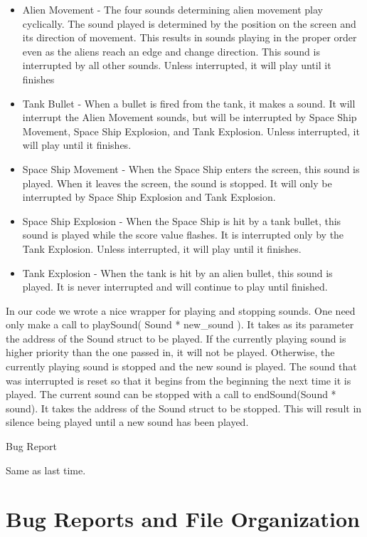 \documentclass[11pt,letter,oneside]{report}
\begin{document}
\begin{itemize}
\item Alien Movement - The four sounds determining alien movement play cyclically.  The sound played is determined by the position on the screen and its direction of movement.  This results in sounds playing in the proper order even as the aliens reach an edge and change direction.  This sound is interrupted by all other sounds.  Unless interrupted, it will play until it finishes
\item Tank Bullet - When a bullet is fired from the tank, it makes a sound.  It will interrupt the Alien Movement sounds, but will be interrupted by Space Ship Movement, Space Ship Explosion, and Tank Explosion.  Unless interrupted, it will play until it finishes.
\item Space Ship Movement - When the Space Ship enters the screen, this sound is played.  When it leaves the screen, the sound is stopped.  It will only be interrupted by Space Ship Explosion and Tank Explosion.
\item Space Ship Explosion - When the Space Ship is hit by a tank bullet, this sound is played while the score value flashes.  It is interrupted only by the Tank Explosion.  Unless interrupted, it will play until it finishes.
\item Tank Explosion - When the tank is hit by an alien bullet, this sound is played.  It is never interrupted and will continue to play until finished.
\end{itemize}

In our code we wrote a nice wrapper for playing and stopping sounds.  One need only make a call to playSound( Sound * new\_sound ).  It takes as its parameter the address of the Sound struct to be played.  If the currently playing sound is higher priority than the one passed in, it will not be played.  Otherwise, the currently playing sound is stopped and the new sound is played.  The sound that was interrupted is reset so that it begins from the beginning the next time it is played.  The current sound can be stopped with a call to endSound(Sound * sound).  It takes the address of the Sound struct to be stopped.  This will result in silence being played until a new sound has been played.

Bug Report

Same as last time.


\chapter{Bug Reports and File Organization}
\end{document}

